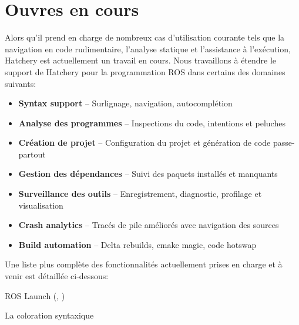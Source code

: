 {\section{Ouvres en cours}

\noindent Alors qu'il prend en charge de nombreux cas d'utilisation courante tels que la navigation en code rudimentaire, l'analyse statique et l'assistance à l'exécution, Hatchery est actuellement un travail en cours. Nous travaillons à étendre le support de Hatchery pour la programmation ROS dans certains des domaines suivants:\vspace{10pt}
%
\begin{itemize}
\item \textbf{Syntax support} -- Surlignage, navigation, autocomplétion
\item \textbf{Analyse des programmes} -- Inspections du code, intentions et peluches
\item \textbf{Création de projet} -- Configuration du projet et génération de code passe-partout
\item \textbf{Gestion des dépendances} -- Suivi des paquets installés et manquants
\item \textbf{Surveillance des outils} -- Enregistrement, diagnostic, profilage et visualisation
\item \textbf{Crash analytics} -- Tracés de pile améliorés avec navigation des sources
\item \textbf{Build automation} -- Delta rebuilds, cmake magic, code hotswap
\end{itemize}\vspace{10pt}
%
Une liste plus complète des fonctionnalités actuellement prises en charge et à venir est détaillée ci-dessous:\vspace{10pt}
%
\begin{multicols}{2}
\begin{todolist}
\item[\done] ROS Launch (\href{https://wiki.ros.org/roslaunch/XML}{}, \href{https://wiki.ros.org/rostest/Writing}{})
\begin{todolist}
\item[\done] La coloration syntaxique

\end{todolist}
\end{todolist}
\end{multicols}}
